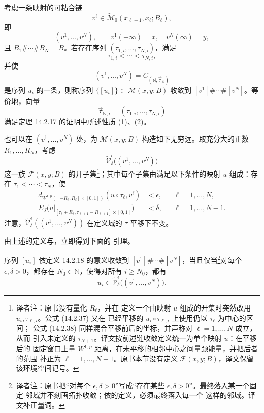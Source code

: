 \begin{definition}
\label{def:convergence-to-gluable-chain}
考虑一条映射的可粘合链
\[
  v^\ell\in
  \widetilde{\mathcal M}_0(x_{\ell-1},x_\ell;B_\ell),
\]
即
\[
  (v^1,\ldots,v^N),
  \qquad
  v^1(-\infty)=x,
  \quad
  v^N(\infty)=y,
\]
且 $B_1\#\cdots\#B_N=B$。若存在序列
$(\tau_{1,i},\ldots,\tau_{N,i})$，满足
\[
  \tau_{1,i}<\cdots<\tau_{N,i},
\]
并使
\[
  (v^1,\ldots,v^N)
  =C_{(\mathbb N,\vec\tau_{\mathbb N})}
\]
是序列 $u_i$ 的一条\termMaximalChain{}，则称序列
$\{[u_i]\}\subset\mathcal M(x,y;B)$ 收敛到
$[v^1]\#\cdots\#[v^N]$。等价地，向量
\[
  \vec\tau_{\mathbb N,i}
  =(\tau_{1,i},\ldots,\tau_{N,i})
\]
满足定理 14.2.17 的证明中所述性质 (1)、(2)。
\end{definition}

也可以在 $(v^1,\ldots,v^N)$ 处，为 $\mathcal M(x,y;B)$ 构造如下无穷远\termNeighborhoodBasis{}。取充分大的正数 $R_1,\ldots,R_N$，考虑
\[
  \widetilde{\mathcal V}^{\epsilon}_{\delta}
  \bigl((v^1,\ldots,v^N)\bigr)
\]
这一族 $\mathcal F(x,y;B)$ 的开子集\footnote{译者注：原书没有量化 $R_\ell$，并在
定义一个由映射 $u$ 组成的开集时突然改用 $u_i,\tau_{\ell,i}$。公式 (14.2.37) 又在
已经平移的 $u_i\circ\tau_{\ell,i}$ 上使用仍以 $\tau_\ell$ 为中心的区间；
公式 (14.2.38) 同样混合平移前后的坐标，并声称对 $\ell=1,\ldots,N$ 成立，从而
引入未定义的 $\tau_{N+1}$。译文按前述链收敛定义统一为单个映射 $u$：在平移后的
固定窗口上量 $W^{1,p}$ 距离，在未平移的相邻中心之间量颈能量，并把后者的范围
补正为 $\ell=1,\ldots,N-1$。原书本节没有定义 $\mathcal F(x,y;B)$，译文保留
该环境空间记号。}；其中每个子集由满足以下条件的映射 $u$
组成：存在 $\tau_1<\cdots<\tau_N$，使
\begin{align}
  d_{W^{1,p}([-R_\ell,R_\ell]\times[0,1])}
  (u\circ\tau_\ell,v^\ell)
  &<\epsilon,
  &&\ell=1,\ldots,N,
  \label{eq:gluable-chain-neighborhood-distance}\\
  E_J\bigl(
    u|_{[\tau_\ell+R_\ell,
           \tau_{\ell+1}-R_{\ell+1}]\times[0,1]}
  \bigr)
  &<\delta,
  &&\ell=1,\ldots,N-1.
  \label{eq:gluable-chain-neighborhood-neck-energy}
\end{align}
注意，$\widetilde{\mathcal V}^{\epsilon}_{\delta}
((v^1,\ldots,v^N))$ 在定义域的 $\tau$-平移下不变。

由上述\termNeighborhoodBasis{}的定义与\termExponentialDecay{}，立即得到下面的
引理。

\begin{lemma}
\label{lem:neighborhood-characterization-chain-convergence}
序列 $[u_i]$ 依定义 14.2.18 的意义收敛到
$[v^1]\#\cdots\#[v^N]$，当且仅当\footnote{译者注：原书把“对每个
$\epsilon,\delta>0$”写成“存在某些 $\epsilon,\delta>0$”。最终落入某一个固定
邻域并不刻画拓扑收敛；依\termNeighborhoodBasis{}的定义，必须最终落入每一个
这样的邻域。译文补正量词。}对每个 $\epsilon,\delta>0$，都存在
$N_0\in\mathbb N$，使得对所有 $i\geq N_0$，都有
\[
  u_i\in
  \widetilde{\mathcal V}^{\epsilon}_{\delta}
  \bigl((v^1,\ldots,v^N)\bigr).
\]
\end{lemma}

